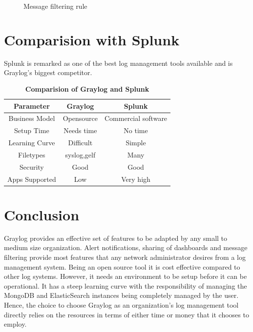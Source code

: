 \documentclass[9pt,twocolumn,twoside]{../../styles/osajnl}
\begin{document}
\begin{figure}[htbp]
\centering
{}
\caption{\cite{www-graylog-blacklisting} Message filtering rule }
\label{fig:Sample filtering rule}
\end{figure}

\section{Comparision with Splunk}
Splunk \CE is remarked as one of the best log management tools available
and is Graylog's biggest competitor.
\newline
\begin{table}[htbp]
\centering
\caption{\bf Comparision of Graylog and Splunk}
\begin{tabular}{ccc}
\hline
Parameter & Graylog & Splunk \\
\hline
Business Model& Opensource & Commercial software \\
Setup Time & Needs time & No time\\
Learning Curve & Difficult & Simple\\
Filetypes & syslog,gelf & Many\\
Security & Good & Good\\
Apps Supported & Low & Very high\\
\hline
\end{tabular}
  \label{tab:shape-functions}
\end{table}

\section{Conclusion}
Graylog provides an effective set of features to be adapted by any
small to medium size organization. Alert notifications, sharing of
dashboards and message filtering provide most features that any
network administrator desires from a log management system. Being an
open source tool it is cost effective compared to other log
systems. However, it needs an environment to be setup before it can be
operational. It has a steep learning curve with the responsibility of
managing the MongoDB and ElasticSearch instances being completely
managed by the user.  Hence, the choice to choose Graylog as an
organization's log management tool directly relies on the resources
in terms of either time or money that it chooses to employ.




\end{document}
